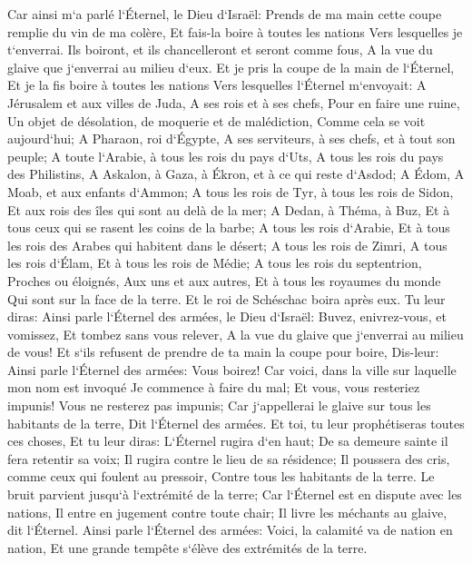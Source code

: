 \verse Car ainsi m`a parlé l`Éternel, le Dieu d`Israël: Prends de ma main cette coupe remplie du vin de ma colère, Et fais-la boire à toutes les nations Vers lesquelles je t`enverrai. 
\verse Ils boiront, et ils chancelleront et seront comme fous, A la vue du glaive que j`enverrai au milieu d`eux. 
\verse Et je pris la coupe de la main de l`Éternel, Et je la fis boire à toutes les nations Vers lesquelles l`Éternel m`envoyait: 
\verse A Jérusalem et aux villes de Juda, A ses rois et à ses chefs, Pour en faire une ruine, Un objet de désolation, de moquerie et de malédiction, Comme cela se voit aujourd`hui; 
\verse A Pharaon, roi d`Égypte, A ses serviteurs, à ses chefs, et à tout son peuple; 
\verse A toute l`Arabie, à tous les rois du pays d`Uts, A tous les rois du pays des Philistins, A Askalon, à Gaza, à Ékron, et à ce qui reste d`Asdod; 
\verse A Édom, A Moab, et aux enfants d`Ammon; 
\verse A tous les rois de Tyr, à tous les rois de Sidon, Et aux rois des îles qui sont au delà de la mer; 
\verse A Dedan, à Théma, à Buz, Et à tous ceux qui se rasent les coins de la barbe; 
\verse A tous les rois d`Arabie, Et à tous les rois des Arabes qui habitent dans le désert; 
\verse A tous les rois de Zimri, A tous les rois d`Élam, Et à tous les rois de Médie; 
\verse A tous les rois du septentrion, Proches ou éloignés, Aux uns et aux autres, Et à tous les royaumes du monde Qui sont sur la face de la terre. Et le roi de Schéschac boira après eux. 
\verse Tu leur diras: Ainsi parle l`Éternel des armées, le Dieu d`Israël: Buvez, enivrez-vous, et vomissez, Et tombez sans vous relever, A la vue du glaive que j`enverrai au milieu de vous! 
\verse Et s`ils refusent de prendre de ta main la coupe pour boire, Dis-leur: Ainsi parle l`Éternel des armées: Vous boirez! 
\verse Car voici, dans la ville sur laquelle mon nom est invoqué Je commence à faire du mal; Et vous, vous resteriez impunis! Vous ne resterez pas impunis; Car j`appellerai le glaive sur tous les habitants de la terre, Dit l`Éternel des armées. 
\verse Et toi, tu leur prophétiseras toutes ces choses, Et tu leur diras: L`Éternel rugira d`en haut; De sa demeure sainte il fera retentir sa voix; Il rugira contre le lieu de sa résidence; Il poussera des cris, comme ceux qui foulent au pressoir, Contre tous les habitants de la terre. 
\verse Le bruit parvient jusqu`à l`extrémité de la terre; Car l`Éternel est en dispute avec les nations, Il entre en jugement contre toute chair; Il livre les méchants au glaive, dit l`Éternel. 
\verse Ainsi parle l`Éternel des armées: Voici, la calamité va de nation en nation, Et une grande tempête s`élève des extrémités de la terre. 
